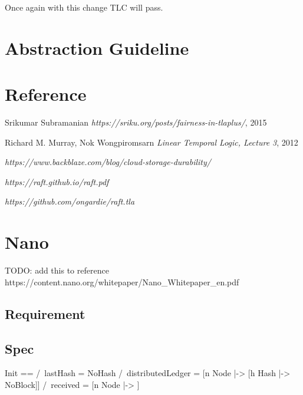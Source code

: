 \documentclass{report}
\begin{document}
Once again with this change TLC will pass.

\chapter{Abstraction Guideline}

\chapter{Reference}

\begin{thebibliography}{9}

\bibitem{}
Srikumar Subramanian
\textit{https://sriku.org/posts/fairness-in-tlaplus/}, 2015

\bibitem{}
Richard M. Murray, Nok Wongpiromsarn
\textit{Linear Temporal Logic, Lecture 3}, 2012

\textit{https://www.backblaze.com/blog/cloud-storage-durability/}

\textit{https://raft.github.io/raft.pdf}

\textit{https://github.com/ongardie/raft.tla}

\end{thebibliography}

\chapter{Nano}

TODO: add this to reference\newline
https://content.nano.org/whitepaper/Nano\_Whitepaper\_en.pdf

\section{Requirement}

\section{Spec}

\begin{tla}
Init ==
    /\ lastHash = NoHash
    /\ distributedLedger = [n \in Node |-> [h \in Hash |-> NoBlock]]
    /\ received = [n \in Node |-> {}]
\end{tla}
\begin{tlatex}
%
%
%
\end{tlatex}
\end{document}
